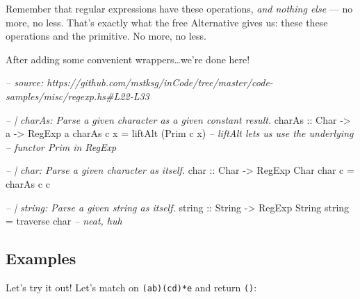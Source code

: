 \documentclass[]{article}
\newenvironment{Shaded}{}{}
\newcommand{\CharTok}[1]{\textcolor[rgb]{0.25,0.44,0.63}{#1}}
\newcommand{\CommentTok}[1]{\textcolor[rgb]{0.38,0.63,0.69}{\textit{#1}}}
\newcommand{\DataTypeTok}[1]{\textcolor[rgb]{0.56,0.13,0.00}{#1}}
\newcommand{\FunctionTok}[1]{\textcolor[rgb]{0.02,0.16,0.49}{#1}}
\newcommand{\NormalTok}[1]{#1}
\newcommand{\OtherTok}[1]{\textcolor[rgb]{0.00,0.44,0.13}{#1}}
\newcommand{\StringTok}[1]{\textcolor[rgb]{0.25,0.44,0.63}{#1}}
\begin{document}
Remember that regular expressions have these operations, \emph{and nothing else}
--- no more, no less. That's exactly what the free Alternative gives us: these
these operations and the primitive. No more, no less.

After adding some convenient wrappers\ldots{}we're done here!

\begin{Shaded}
\begin{Highlighting}[]
\CommentTok{-- source: https://github.com/mstksg/inCode/tree/master/code-samples/misc/regexp.hs#L22-L33}

\CommentTok{-- | charAs: Parse a given character as a given constant result.}
\OtherTok{charAs ::} \DataTypeTok{Char} \OtherTok{->}\NormalTok{ a }\OtherTok{->} \DataTypeTok{RegExp}\NormalTok{ a}
\NormalTok{charAs c x }\FunctionTok{=}\NormalTok{ liftAlt (}\DataTypeTok{Prim}\NormalTok{ c x)     }\CommentTok{-- liftAlt lets us use the underlying}
                                    \CommentTok{-- functor Prim in RegExp}

\CommentTok{-- | char: Parse a given character as itself.}
\OtherTok{char ::} \DataTypeTok{Char} \OtherTok{->} \DataTypeTok{RegExp} \DataTypeTok{Char}
\NormalTok{char c }\FunctionTok{=}\NormalTok{ charAs c c}

\CommentTok{-- | string: Parse a given string as itself.}
\OtherTok{string ::} \DataTypeTok{String} \OtherTok{->} \DataTypeTok{RegExp} \DataTypeTok{String}
\NormalTok{string }\FunctionTok{=} \FunctionTok{traverse}\NormalTok{ char              }\CommentTok{-- neat, huh}
\end{Highlighting}
\end{Shaded}

\hypertarget{examples}{%
\subsection{Examples}\label{examples}}

Let's try it out! Let's match on \texttt{(a\textbar{}b)(cd)*e} and return
\texttt{()}:

\begin{Shaded}
\end{Shaded}
\end{document}
